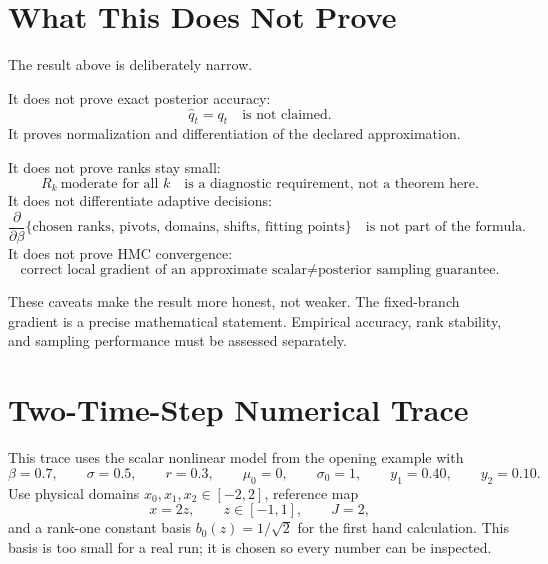 \documentclass[11pt]{article}
\begin{document}
\section{What This Does Not Prove}

The result above is deliberately narrow.

It does not prove exact posterior accuracy:
\[
    \widehat q_t=q_t
    \quad\text{is not claimed.}
    \label{eq:p24-p19-90}
\]
It proves normalization and differentiation of the declared approximation.

It does not prove ranks stay small:
\[
    R_k\ \text{moderate for all }k
    \quad\text{is a diagnostic requirement, not a theorem here.}
    \label{eq:p24-p19-91}
\]
It does not differentiate adaptive decisions:
\[
    \frac{\partial}{\partial\beta}
    \{\text{chosen ranks, pivots, domains, shifts, fitting points}\}
    \quad\text{is not part of the formula.}
    \label{eq:p24-p19-92}
\]
It does not prove HMC convergence:
\[
    \text{correct local gradient of an approximate scalar}
    \ne
    \text{posterior sampling guarantee.}
    \label{eq:p24-p19-93}
\]

These caveats make the result more honest, not weaker.  The fixed-branch
gradient is a precise mathematical statement.  Empirical accuracy, rank
stability, and sampling performance must be assessed separately.

\section{Two-Time-Step Numerical Trace}

This trace uses the scalar nonlinear model from the opening example with
\[
    \beta=0.7,\qquad \sigma=0.5,\qquad r=0.3,\qquad
    \mu_0=0,\qquad \sigma_0=1,
    \qquad y_1=0.40,\qquad y_2=0.10.
    \label{eq:p24-trace-params}
\]
Use physical domains \(x_0,x_1,x_2\in[-2,2]\), reference map
\[
    x=2z,\qquad z\in[-1,1],\qquad J=2,
    \label{eq:p24-trace-map}
\]
and a rank-one constant basis \(b_0(z)=1/\sqrt2\) for the first hand
calculation.  This basis is too small for a real run; it is chosen so every
number can be inspected.
\end{document}
